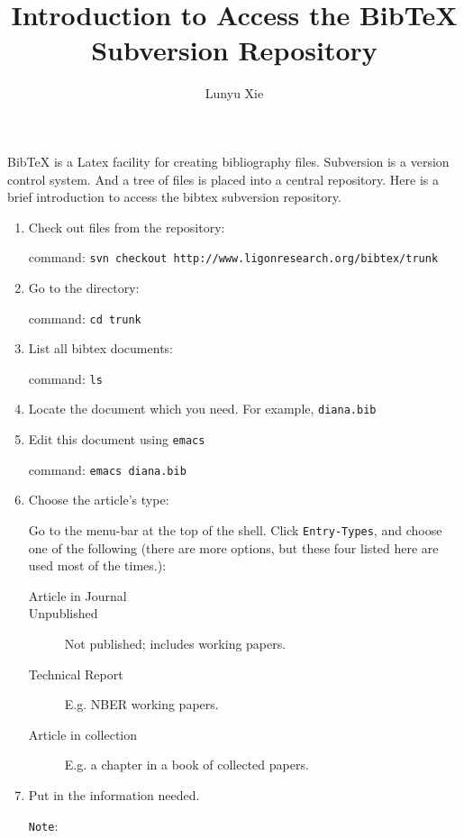 \documentclass{article}
\begin{document}
\title{Introduction to Access the BibTeX Subversion Repository}
\author{Lunyu Xie}
\maketitle

BibTeX is a Latex facility for creating bibliography files. Subversion
is a version control system. And a tree of files is placed into a
central repository. Here is a brief introduction to access the bibtex
subversion repository.

\begin{enumerate}
\item{Check out files from the repository:

command: \texttt{svn checkout http://www.ligonresearch.org/bibtex/trunk}}

\item{Go to the directory:

command: \texttt{cd trunk}}


\item{List all bibtex documents:

command: \texttt{ls}}


\item{Locate the document which you need. For example, \texttt{diana.bib}}


\item{Edit this document using \texttt{emacs}

command: \texttt{emacs diana.bib}}


\item{Choose the article's type:

    Go to the menu-bar at the top of the shell. Click
    \texttt{Entry-Types}, and choose one of the following (there are more options, but these four listed here are used most of the times.):
    \begin{description}
    \item[Article in Journal]
    \item[Unpublished]{Not published; includes working papers.}
    \item[Technical Report]{E.g. NBER working papers.}
    \item[Article in collection]{E.g. a chapter in a book of collected papers.}
    \end{description}}

\item{Put in the information needed.

\texttt{Note}: 

}
\end{enumerate}
\end{document}
